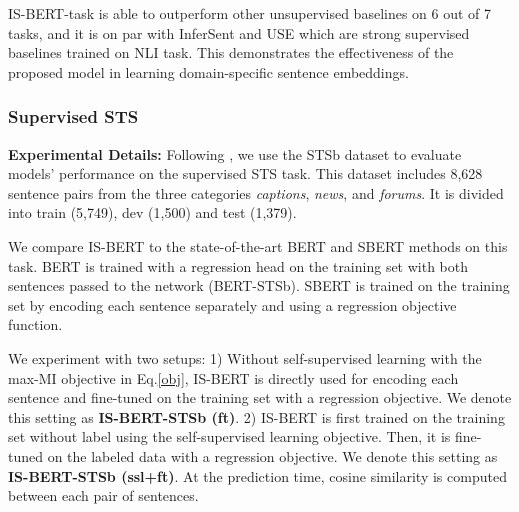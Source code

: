 \documentclass[11pt,a4paper]{article}
\begin{document}
IS-BERT-task is able to outperform other unsupervised baselines on 6 out of 7 tasks, and it is on par with InferSent and USE which are strong supervised baselines trained on NLI task. This demonstrates the effectiveness of the proposed model in learning domain-specific sentence embeddings. 



\subsubsection{Supervised STS}
\begin{table}[t]
\centering
{}
\caption{Spearman's rank correlation  on the STSb test set. Results of baselines are extracted from \cite{reimers2019}. All systems are
trained with 10 random seeds to counter variances \cite{reimers2019}.}
\end{table} 
\textbf{Experimental Details:} Following \citet{reimers2019}, we use the STSb \cite{cer2017} dataset to evaluate models' performance on the supervised STS task. This dataset includes 8,628 sentence pairs from the three categories \emph{captions}, \emph{news}, and \emph{forums}. It is divided into train (5,749), dev (1,500) and test (1,379). 

We compare IS-BERT to the state-of-the-art BERT and SBERT methods on this task. BERT is trained with a regression head on the training set with both sentences passed to the network (BERT-STSb). SBERT is trained on the training set by encoding each sentence separately and using a regression objective function. 

We experiment with two setups: 1) 
Without self-supervised learning with the max-MI objective in Eq.\ref{obj}, IS-BERT is directly used for encoding each sentence and fine-tuned on the training set with a regression objective. We denote this setting as \textbf{IS-BERT-STSb (ft)}. 2) IS-BERT is first trained on the training set without label using the self-supervised learning objective. Then, it is fine-tuned on the labeled data with a regression objective. We denote this setting as \textbf{IS-BERT-STSb (ssl+ft)}. 
At the prediction time, cosine similarity is computed between each pair of sentences. 
\medskip
\end{document}
